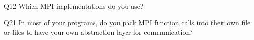 \begin{description}%
\item{Q12} Which MPI implementations do you use?%
\item{Q21} In most of your programs, do you pack MPI function calls into their own file or files to have your own abstraction layer for communication?%
\end{description}%
